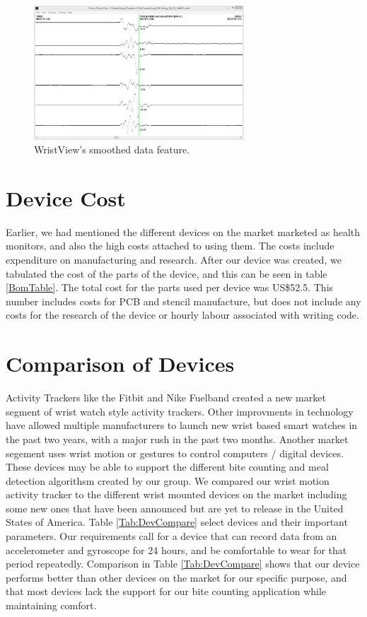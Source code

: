 \begin{figure}
\begin{center}
\includegraphics[width=0.7\textwidth]{images/WristSmooth.jpg}
\caption{WristView's smoothed data feature.}
\label{Fig:WristViewSoomth}
\end{center}
\end{figure}

\section{Device Cost}
\label{Sec:DevCost}
Earlier, we had mentioned the different devices on the market marketed as health monitors,
and also the high costs attached to using them.
The costs include expenditure on manufacturing and research.
After our device was created, 
we tabulated the cost of the parts of the device, and this can be seen in table \ref{BomTable}.
The total cost for the parts used per device was US\$52.5.
This number includes costs for PCB and stencil manufacture, but does not include any costs for the research of the device or hourly labour associated with writing code.


\section{Comparison of Devices}
\label{Sec:Comparison}
Activity Trackers like the Fitbit and Nike Fuelband created a new market segment of
wrist watch style activity trackers.
Other improvments in technology have allowed multiple manufacturers to launch new
wrist based smart watches in the past two years,
with a major rush in the past two months.
Another market segement uses wrist motion or gestures to control computers / digital devices.
These devices may be able to support the different bite counting and meal detection algorithsm created by our group.
We compared our wrist motion activity tracker to the different wrist mounted devices on the market
including some new ones that have been announced but are yet to release in the United States of America.
Table \ref{Tab:DevCompare} select devices and their important parameters.
Our requirements call for a device that can record data from an accelerometer and gyroscope for 24 hours,
and be comfortable to wear for that period repeatedly. Comparison in Table \ref{Tab:DevCompare} shows that our device performs better than other devices on the market for our specific purpose, and that most devices lack the support for our bite counting application while maintaining comfort.
